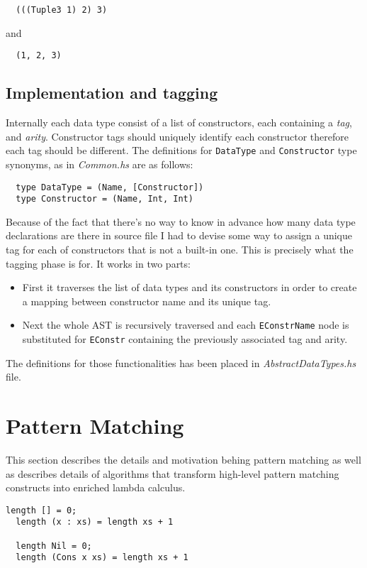 \documentclass[a4paper]{report}
\begin{document}
\begin{verbatim}
  (((Tuple3 1) 2) 3)
\end{verbatim}
and
\begin{verbatim}
  (1, 2, 3)
\end{verbatim}

\subsection{Implementation and tagging}
Internally each data type consist of a list of constructors, each containing a
\textit{tag}, and \textit{arity}. Constructor tags should uniquely identify
each constructor therefore each tag should be different. The definitions
for \texttt{DataType} and \texttt{Constructor} type synonyms, as in
\textit{Common.hs} are as follows:

\begin{verbatim}
  type DataType = (Name, [Constructor])
  type Constructor = (Name, Int, Int)
\end{verbatim}

Because of the fact that there's no way to know in advance how many data type
declarations are there in source file I had to devise some way to assign a
unique tag for each of constructors that is not a built-in one. This is
precisely what the tagging phase is for. It works in two parts:

\begin{itemize}
  \item First it traverses the list of data types and its constructors in order
    to create a mapping between constructor name and its unique tag.
  \item Next the whole AST is recursively traversed and each
    \texttt{EConstrName} node is substituted for \texttt{EConstr} containing
    the previously associated tag and arity.
\end{itemize}

The definitions for those functionalities has been placed in
\textit{AbstractDataTypes.hs} file.


\section{Pattern Matching}
This section describes the details and motivation behing pattern matching as
well as describes details of algorithms that transform high-level pattern
matching constructs into enriched lambda calculus.

\begin{lstlisting}[label=lst:length,caption={Calculating length of list.}]
  length [] = 0;
  length (x : xs) = length xs + 1

  length Nil = 0;
  length (Cons x xs) = length xs + 1
\end{lstlisting}
\end{document}
